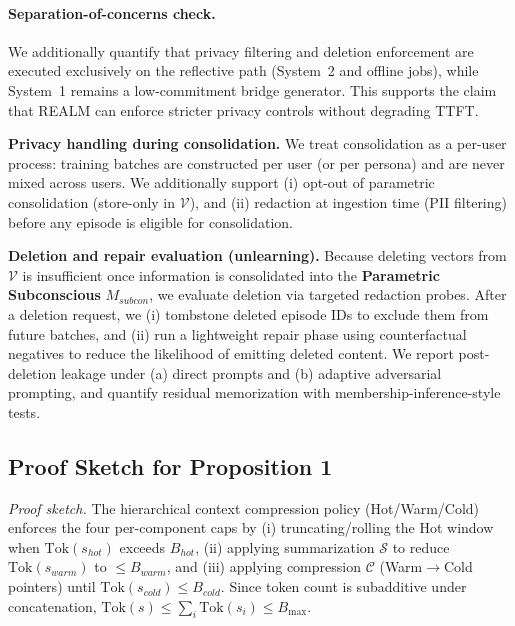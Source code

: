 \documentclass{article}
\begin{document}
\paragraph{Separation-of-concerns check.}
We additionally quantify that privacy filtering and deletion enforcement are executed exclusively on the reflective path (System~2 and offline jobs), while System~1 remains a low-commitment bridge generator.
This supports the claim that REALM can enforce stricter privacy controls without degrading TTFT.

\textbf{Privacy handling during consolidation.}
We treat consolidation as a per-user process: training batches are constructed per user (or per persona) and are never mixed across users.
We additionally support (i) opt-out of parametric consolidation (store-only in $\mathcal{V}$), and (ii) redaction at ingestion time (PII filtering) before any episode is eligible for consolidation.

\textbf{Deletion and repair evaluation (unlearning).}
Because deleting vectors from $\mathcal{V}$ is insufficient once information is consolidated into the \textbf{Parametric Subconscious} $M_{subcon}$, we evaluate deletion via targeted redaction probes.
After a deletion request, we (i) tombstone deleted episode IDs to exclude them from future batches, and (ii) run a lightweight repair phase using counterfactual negatives to reduce the likelihood of emitting deleted content.
We report post-deletion leakage under (a) direct prompts and (b) adaptive adversarial prompting, and quantify residual memorization with membership-inference-style tests.

\subsection{Proof Sketch for Proposition 1}
\textit{Proof sketch.} The hierarchical context compression policy (Hot/Warm/Cold) enforces the four per-component caps by (i) truncating/rolling the Hot window when $\mathrm{Tok}(s_{hot})$ exceeds $B_{hot}$, (ii) applying summarization $\mathcal{S}$ to reduce $\mathrm{Tok}(s_{warm})$ to $\le B_{warm}$, and (iii) applying compression $\mathcal{C}$ (Warm$\to$Cold pointers) until $\mathrm{Tok}(s_{cold})\le B_{cold}$. Since token count is subadditive under concatenation, $\mathrm{Tok}(s)\le \sum_i \mathrm{Tok}(s_i)\le B_{\max}$.
\end{document}
